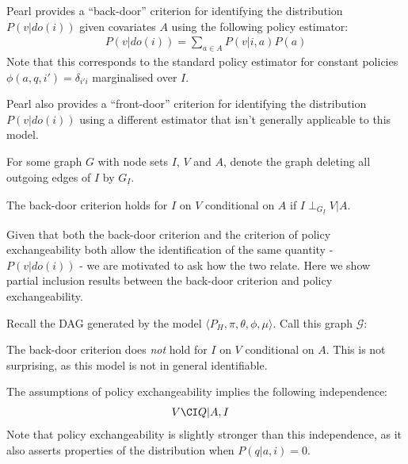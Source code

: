 Pearl provides a ``back-door'' criterion for identifying the distribution $P(v|do(i))$ given covariates $A$ using the following policy estimator:
\begin{align}
    P(v|do(i)) = \sum_{a\in A} P(v|i,a) P(a)
\end{align}
Note that this corresponds to the standard policy estimator for constant policies $\phi(a,q,i') = \delta_{i'i}$ marginalised over $I$.

Pearl also provides a ``front-door'' criterion for identifying the distribution $P(v|do(i))$ using a different estimator that isn't generally applicable to this model.

\begin{definition}
For some graph $G$ with node sets $I$, $V$ and $A$, denote the graph deleting all outgoing edges of $I$ by $G_{\underline{I}}$.

The back-door criterion holds for $I$ on $V$ conditional on $A$ if $I\perp_{G_{\underline{I}}} V|A$.
\end{definition}

Given that both the back-door criterion and the criterion of policy exchangeability both allow the identification of the same quantity - $P(v|do(i))$ - we are motivated to ask how the two relate. Here we show partial inclusion results between the back-door criterion and policy exchangeability.

Recall the DAG generated by the model $\langle P_H, \pi,\theta,\phi,\mu\rangle$. Call this graph $\mathcal{G}$:
\begin{center}
\end{center}

The back-door criterion does \emph{not} hold for $I$ on $V$ conditional on $A$. This is not surprising, as this model is not in general identifiable.

The assumptions of policy exchangeability implies the following independence:
\begin{align}
    V&\CI Q|A,I
\end{align}
Note that policy exchangeability is slightly stronger than this independence, as it also asserts properties of the distribution when $P(q|a,i)=0$.

